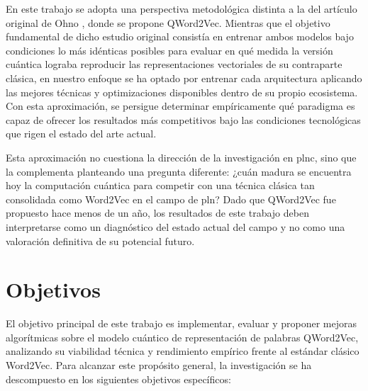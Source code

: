 En este trabajo se adopta una perspectiva metodológica distinta a la del artículo original de Ohno \cite{ohno_qword2vec_2025}, donde se propone QWord2Vec. Mientras que el objetivo fundamental de dicho estudio original consistía en entrenar ambos modelos bajo condiciones lo más idénticas posibles para evaluar en qué medida la versión cuántica lograba reproducir las representaciones vectoriales de su contraparte clásica, en nuestro enfoque se ha optado por entrenar cada arquitectura aplicando las mejores técnicas y optimizaciones disponibles dentro de su propio ecosistema. Con esta aproximación, se persigue determinar empíricamente qué paradigma es capaz de ofrecer los resultados más competitivos bajo las condiciones tecnológicas que rigen el estado del arte actual.

Esta aproximación no cuestiona la dirección de la investigación en \gls{plnc}, sino que la complementa planteando una pregunta diferente: ¿cuán madura se encuentra hoy la computación cuántica para competir con una técnica clásica tan consolidada como Word2Vec en el campo de \gls{pln}? Dado que QWord2Vec fue propuesto hace menos de un año, los resultados de este trabajo deben interpretarse como un diagnóstico del estado actual del campo y no como una valoración definitiva de su potencial futuro.

\section{Objetivos}

El objetivo principal de este trabajo es implementar, evaluar y proponer mejoras algorítmicas sobre el modelo cuántico de representación de palabras QWord2Vec, analizando su viabilidad técnica y rendimiento empírico frente al estándar clásico Word2Vec. Para alcanzar este propósito general, la investigación se ha descompuesto en los siguientes objetivos específicos:

